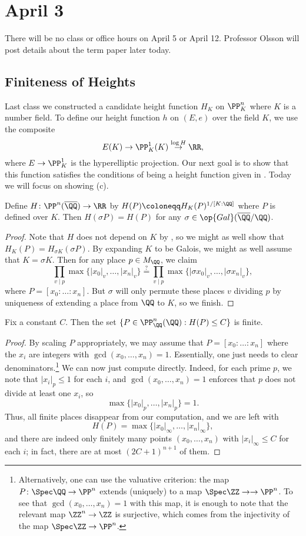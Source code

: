 \documentclass[../notes.tex]{subfiles}
\begin{document}
\section{April 3}

There will be no class or office hours on April 5 or April 12. Professor Olsson will post details about the term paper later today.

\subsection{Finiteness of Heights}
Last class we constructed a candidate height function $H_K$ on $\PP^n_K$ where $K$ is a number field. To define our height function $h$ on $(E,e)$ over the field $K$, we use the composite
\[E(K)\to\PP^1_K(K)\stackrel{\log H}\to\RR,\]
where $E\to\PP^1_K$ is the hyperelliptic projection. Our next goal is to show that this function satisfies the conditions of being a height function given in . Today we will focus on showing (c).
\begin{lemma}
	Define $H\colon\PP^n(\overline\QQ)\to\RR$ by $H(P)\coloneqq H_K(P)^{1/[K:\QQ]}$ where $P$ is defined over $K$. Then $H(\sigma P)=H(P)$ for any $\sigma\in\op{Gal}(\overline\QQ/\QQ)$.
\end{lemma}
\begin{proof}
	Note that $H$ does not depend on $K$ by , so we might as well show that $H_K(P)=H_{\sigma K}(\sigma P)$. By expanding $K$ to be Galois, we might as well assume that $K=\sigma K$. Then for any place $p\in M_\QQ$, we claim
	\[\prod_{v\mid p}\max\{|x_0|_v,\ldots,|x_n|_v\}\stackrel?=\prod_{v\mid p}\max\{|\sigma x_0|_v,\ldots,|\sigma x_n|_v\},\]
	where $P=[x_0:\ldots:x_n]$. But $\sigma$ will only permute these places $v$ dividing $p$ by uniqueness of extending a place from $\QQ$ to $K$, so we finish.
\end{proof}
\begin{lemma} \label{lem:height-on-q}
	Fix a constant $C$. Then the set $\{P\in\PP^n_\QQ(\QQ):H(P)\le C\}$ is finite.
\end{lemma}
\begin{proof}
	By scaling $P$ appropriately, we may assume that $P=[x_0:\ldots:x_n]$ where the $x_i$ are integers with $\gcd(x_0,\ldots,x_n)=1$. Essentially, one just needs to clear denominators.\footnote{Alternatively, one can use the valuative criterion: the map $P\colon\Spec\QQ\to\PP^n$ extends (uniquely) to a map $\Spec\ZZ\to\to\PP^n$. To see that $\gcd(x_0,\ldots,x_n)=1$ with this map, it is enough to note that the relevant map $\ZZ^n\to\ZZ$ is surjective, which comes from the injectivity of the map $\Spec\ZZ\to\PP^n$.} We can now just compute directly. Indeed, for each prime $p$, we note that $|x_i|_p\le1$ for each $i$, and $\gcd(x_0,\ldots,x_n)=1$ enforces that $p$ does not divide at least one $x_i$, so
	\[\max\{|x_0|_p,\ldots,|x_n|_p\}=1.\]
	Thus, all finite places disappear from our computation, and we are left with
	\[H(P)=\max\{|x_0|_\infty,\ldots,|x_n|_\infty\},\]
	and there are indeed only finitely many points $(x_0,\ldots,x_n)$ with $|x_i|_\infty\le C$ for each $i$; in fact, there are at most $(2C+1)^{n+1}$ of them.
\end{proof}
\end{document}
